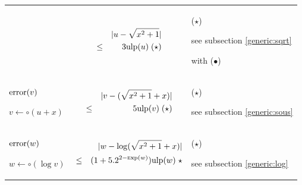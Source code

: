 \documentclass[12pt]{amsart}
\def\ulp{{\rm ulp}}
\def\Exp{{\rm \textsc exp}}
\begin{document}
\begin{center}
\begin{tabular}{l l l}
\begin{minipage}{2.5cm}
\end{minipage} &
\begin{minipage}{7.5cm}

\begin{eqnarray}\nonumber
  &&|u-\sqrt{x^2+1}| \\\nonumber
  &       \leq& 3 \ulp(u) \;(\star)
\end{eqnarray}


\end{minipage} &
\begin{minipage}{6cm}

($\star$)

see subsection \ref{generic:sqrt}

with ($\bullet$)

\end{minipage}\\%
\begin{minipage}{2.5cm}
${\textnormal{error}}(v)$


$v \leftarrow \circ(u+x) $


\end{minipage} &
\begin{minipage}{7.5cm}

\begin{eqnarray}\nonumber
  &&|v-(\sqrt{x^2+1}+x)| \\\nonumber
  &       \leq& 5 \ulp(v) \;(\star)
\end{eqnarray}


\end{minipage} &
\begin{minipage}{6cm}

($\star$)

see subsection \ref{generic:sous}

\end{minipage}\\%
\begin{minipage}{2.5cm}
${\textnormal{error}}(w)$


$w \leftarrow \circ(\log v) $
\end{minipage} &
\begin{minipage}{7.5cm}

\begin{eqnarray}\nonumber
  &&|w-\log(\sqrt{x^2+1}+x)| \\\nonumber
  &       \leq& (1+5.2^{2-\Exp(w)}) \ulp(w) \;\star
\end{eqnarray}


\end{minipage} &
\begin{minipage}{6cm}

($\star$)

see subsection \ref{generic:log}

\end{minipage}
\end{tabular}
\end{center}
\end{document}
